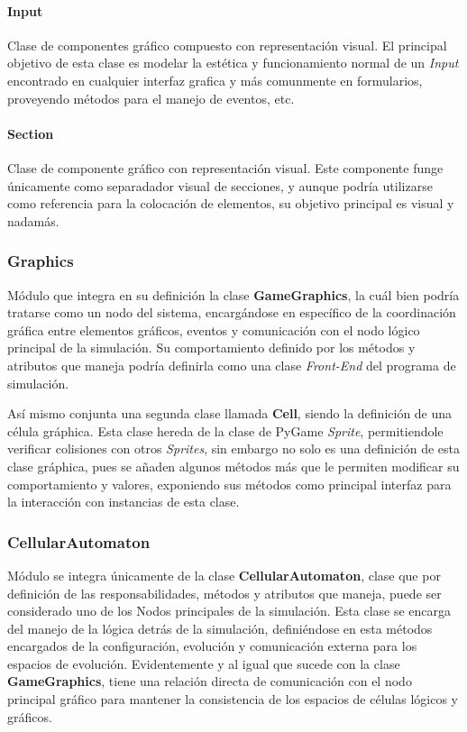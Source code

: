\documentclass[]{article}
\begin{document}
			\paragraph{Input}
				Clase de componentes gráfico compuesto con representación visual. El principal objetivo de esta clase es modelar la estética y funcionamiento normal de un \textit{Input} encontrado en cualquier interfaz grafica y más comunmente en formularios, proveyendo métodos para el manejo de eventos, etc.
				
			\paragraph{Section}
				Clase de componente gráfico con representación visual. Este componente funge únicamente como separadador visual de secciones, y aunque podría utilizarse como referencia para la colocación de elementos, su objetivo principal es visual y nadamás.
				
			
			
		
		\subsubsection{Graphics}
			Módulo que integra en su definición la clase \textbf{GameGraphics}, la cuál bien podría tratarse como un nodo del sistema, encargándose en específico de la coordinación gráfica entre elementos gráficos, eventos y comunicación con el nodo lógico principal de la simulación. Su comportamiento definido por los métodos y atributos que maneja podría definirla como una clase \textit{Front-End} del programa de simulación.
			
			Así mismo conjunta una segunda clase llamada \textbf{Cell}, siendo la definición de una célula gráphica. Esta clase hereda de la clase de PyGame \textit{Sprite}, permitiendole verificar colisiones con otros \textit{Sprites}, sin embargo no solo es una definición de esta clase gráphica, pues se añaden algunos métodos más que le permiten modificar su comportamiento y valores, exponiendo sus métodos como principal interfaz para la interacción con instancias de esta clase.
			
			
			
		\subsubsection{CellularAutomaton}
			Módulo se integra únicamente de la clase \textbf{CellularAutomaton}, clase que por definición de las responsabilidades, métodos y atributos que maneja, puede ser considerado uno de los Nodos principales de la simulación. Esta clase se encarga del manejo de la lógica detrás de la simulación, definiéndose en esta métodos encargados de la configuración, evolución y comunicación externa para los espacios de evolución. Evidentemente y al igual que sucede con la clase \textbf{GameGraphics}, tiene una relación directa de comunicación con el nodo principal gráfico para mantener la consistencia de los espacios de células lógicos y gráficos.
			
\end{document}
